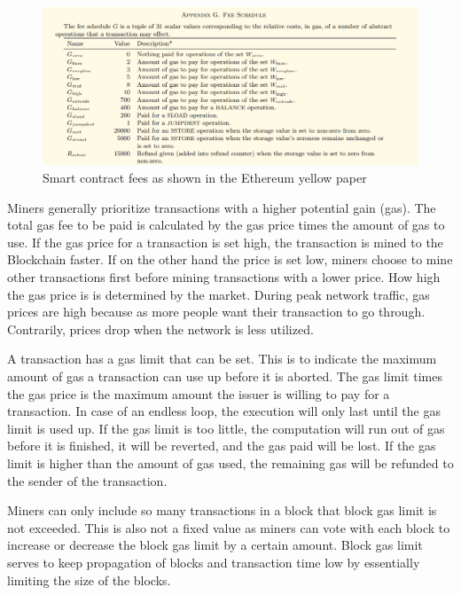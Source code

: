 \begin{figure}[ht!]
  \begin{center}
    \includegraphics[scale=0.6]{Talk7/img/smart_contracts/gas-fees}
  \end{center}
  \caption{Smart contract fees as shown in the Ethereum yellow paper}
  \label{fig:smart_contract_fees}
\end{figure}

Miners generally prioritize transactions with a higher potential gain (gas). The total gas fee to be paid is calculated by the gas price times the amount of gas to use. If the gas price for a transaction is set high, the transaction is mined to the Blockchain faster. If on the other hand the price is set low, miners choose to mine other transactions first before mining transactions with a lower price. How high the gas price is is determined by the market. During peak network traffic, gas prices are high because as more people want their transaction to go through. Contrarily, prices drop when the network is less utilized.

A transaction has a gas limit that can be set. This is to indicate the maximum amount of gas a transaction can use up before it is aborted. The gas limit times the gas price is the maximum amount the issuer is willing to pay for a transaction. In case of an endless loop, the execution will only last until the gas limit is used up.
If the gas limit is too little, the computation will run out of gas before it is finished, it will be reverted, and the gas paid will be lost. If the gas limit is higher than the amount of gas used, the remaining gas will be refunded to the sender of the transaction.

Miners can only include so many transactions in a block that block gas limit is not exceeded. This is also not a fixed value as miners can vote with each block to increase or decrease the block gas limit by a certain amount. Block gas limit serves to keep propagation of blocks and transaction time low by essentially limiting the size of the blocks.

